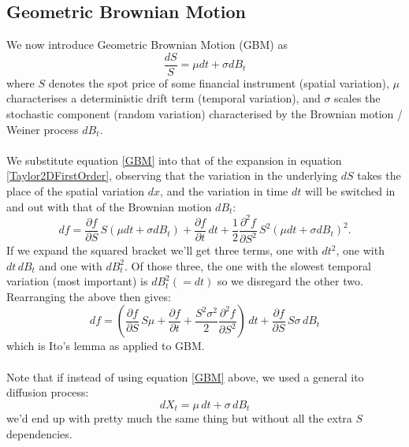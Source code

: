 \documentclass[12pt]{article}
\newcommand{\dpart}[2]{\frac{\partial #1}{\partial #2}}
\begin{document}
\subsection{Geometric Brownian Motion}
We now introduce Geometric Brownian Motion (GBM) as
\begin{equation}\label{GBM}
	\frac{dS}{S}=\mu dt+\sigma dB_t
\end{equation}
where $S$ denotes the spot price of some financial instrument (spatial variation), $\mu$ characterises a deterministic drift term (temporal variation), and $\sigma$ scales the stochastic component (random variation) characterised by the Brownian motion / Weiner process $dB_t$.\\
\\
We substitute equation \ref{GBM} into that of the expansion in equation \ref{Taylor2DFirstOrder}, observing that the variation in the underlying $dS$ takes the place of the spatial variation $dx$, and the variation in time $dt$ will be switched in and out with that of the Brownian motion $dB_t$:
\begin{equation}
	df=\dpart{f}{S}\,S\left(\mu dt+\sigma dB_t\right)+\dpart{f}{t}\,dt+\frac{1}{2}\frac{\partial^2 f}{\partial S^2}\,S^2\left(\mu dt+\sigma dB_t\right)^2.
\end{equation}
If we expand the squared bracket we'll get three terms, one with $dt^2$, one with $dt\,dB_t$ and one with $dB_t^2$. Of those three, the one with the slowest temporal variation (most important) is $dB_t^2(=dt)$ so we disregard the other two. Rearranging the above then gives:
\begin{equation}
	df=\left(\dpart{f}{S}\,S\mu+\dpart{f}{t}+\frac{S^2\sigma^2}{2}\frac{\partial^2 f}{\partial S^2}\right)\,dt + \dpart{f}{S}\,S\sigma\,dB_t
\end{equation}
which is Ito's lemma as applied to GBM.\\
\\
Note that if instead of using equation \ref{GBM} above, we used a general ito diffusion process:
\begin{equation}
	dX_t=\mu\,dt+\sigma\,dB_t
\end{equation}
we'd end up with pretty much the same thing but without all the extra $S$ dependencies.
\end{document}
